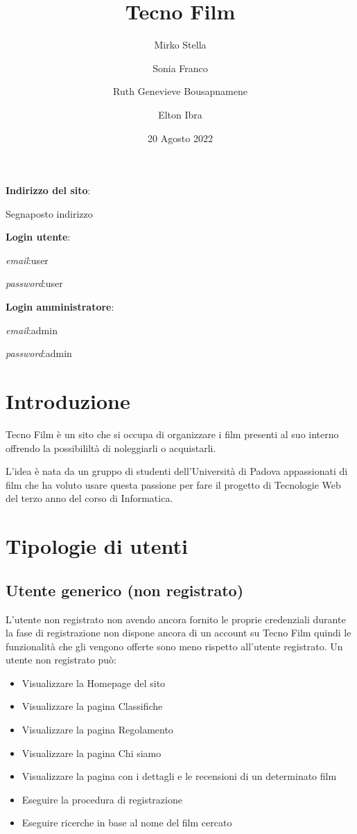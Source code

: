 \documentclass[a4paper]{article}
\author{Mirko Stella \and Sonia Franco \and Ruth Genevieve Bousapnamene \and Elton Ibra}
\title{Tecno Film}
\date{20 Agosto 2022}
\begin{document}
\maketitle
\textbf{Indirizzo del sito}:

Segnaposto indirizzo

\textbf{Login utente}:

\textit{email}:user 

\textit{password}:user
 
\textbf{Login amministratore}:

\textit{email}:admin 

\textit{password}:admin

\tableofcontents
\newpage
\section{Introduzione}
    Tecno Film \`e un sito che si occupa di organizzare i film presenti al suo interno offrendo la possibililt\`a di 
    noleggiarli o acquistarli.

    L'idea \`e nata da un gruppo di studenti dell'Universit\`a di Padova appassionati di film che ha voluto usare questa 
    passione per fare il progetto di 
    Tecnologie Web del terzo anno del corso di Informatica.

\section{Tipologie di utenti}
\subsection{Utente generico (non registrato)}
    L'utente non registrato non avendo ancora fornito le proprie credenziali durante la fase di registrazione non dispone 
    ancora di un account su Tecno Film quindi le funzionalit\`a che gli vengono offerte sono meno rispetto all'utente registrato.
    Un utente non registrato pu\`o:
\begin{itemize}
    \item{Visualizzare la Homepage del sito}
    \item{Visualizzare la pagina Classifiche}
    \item{Visualizzare la pagina Regolamento}
    \item{Visualizzare la pagina Chi siamo}
    \item{Visualizzare la pagina con i dettagli e le recensioni di un determinato film}
    \item{Eseguire la procedura di registrazione}
    \item{Eseguire ricerche in base al nome del film cercato}
\end{itemize}
\end{document}
